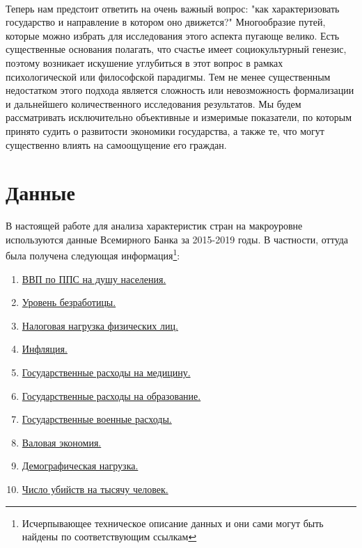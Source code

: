 \documentclass[russian]{vegareport}
\begin{document}
        \\
        Теперь нам предстоит ответить на очень важный вопрос: "как характеризовать государство и направление в котором оно движется?" Многообразие путей, которые можно избрать для исследования этого аспекта пугающе велико. Есть существенные основания полагать, что счастье имеет социокультурный генезис, поэтому возникает искушение углубиться в этот вопрос в рамках психологической или философской парадигмы. Тем не менее существенным недостатком этого подхода является сложность или невозможность формализации и дальнейшего количественного исследования результатов. Мы будем рассматривать исключительно объективные и измеримые показатели, по которым принято судить о развитости экономики государства, а также те, что могут существенно влиять на самоощущение его граждан.

        \section{Данные}
        В настоящей работе для анализа характеристик стран на макроуровне используются данные Всемирного Банка за 2015-2019 годы. В частности, оттуда была получена следующая информация\footnote{Исчерпывающее техническое описание данных и они сами могут быть найдены по соответствующим ссылкам}:
        \begin{enumerate} \label{table}
        \item \href{https://data.worldbank.org/indicator/NY.GDP.PCAP.PP.CD}{ВВП по ППС на душу населения.}
        \item \href{https://data.worldbank.org/indicator/GB.XPD.RSDV.GD.ZS?view=chart}{Уровень безработицы.}
        \item \href{https://data.worldbank.org/indicator/IC.TAX.TOTL.CP.ZS?view=chart}{Налоговая нагрузка физических лиц.}
        \item \href{https://data.worldbank.org/indicator/FP.CPI.TOTL.ZG?view=chart}{Инфляция.}
        \item \href{https://data.worldbank.org/indicator/SH.XPD.CHEX.GD.ZS}{Государственные расходы на медицину.}
        \item \href{https://data.worldbank.org/indicator/SE.XPD.TOTL.GD.ZS?view=chart }{Государственные расходы на образование.}
        \item \href{https://data.worldbank.org/indicator/MS.MIL.XPND.GD.ZS}{Государственные военные расходы.}
        \item \href{https://data.worldbank.org/indicator/NY.GNS.ICTR.ZS?view=chart}{Валовая экономия.}
        \item \href{https://data.worldbank.org/indicator/SP.POP.DPND}{Демографическая нагрузка.}
        \item \href{https://data.worldbank.org/indicator/VC.IHR.PSRC.P5}{Число убийств на тысячу человек.}
        \end{enumerate}
\end{document}
